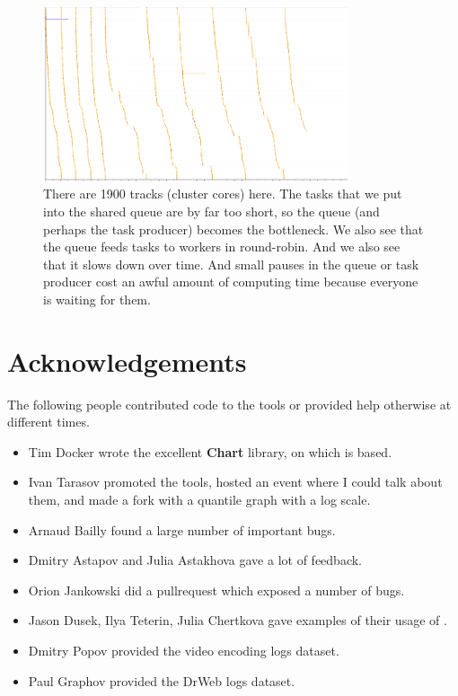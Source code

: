 \documentclass{article}
\begin{document}
\begin{figure}[p]
\center
\includegraphics[width=0.8\textwidth]{pics/splot/spray.png}
\caption{There are 1900 tracks (cluster cores) here. The tasks that we put into the shared queue are by far too short, so the queue (and perhaps the task producer) becomes the bottleneck. We also see that the queue feeds tasks to workers in round-robin. And we also see that it slows down over time. And small pauses in the queue or task producer cost an awful amount of computing time because everyone is waiting for them.}
\label{fig:splot-gallery-last}
\end{figure}

\pagebreak

\section{Acknowledgements}

The following people contributed code to the tools or provided help otherwise at different times.
\begin{itemize}
\item Tim Docker wrote the excellent \textbf{Chart} library, on which \timeplot{} is based.
\item Ivan Tarasov promoted the tools, hosted an event where I could talk about them, and made a fork with a quantile graph with a log scale.
\item Arnaud Bailly found a large number of important bugs.
\item Dmitry Astapov and Julia Astakhova gave a lot of feedback.
\item Orion Jankowski did a pullrequest which exposed a number of bugs.
\item Jason Dusek, Ilya Teterin, Julia Chertkova gave examples of their usage of \timeplot{}.
\item Dmitry Popov provided the video encoding logs dataset.
\item Paul Graphov provided the DrWeb logs dataset.
\end{itemize}
\end{document}
